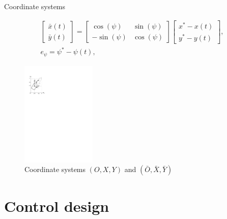\documentclass[10pt,pdf,hyperref={unicode}]{beamer}
\begin{document}
\begin{frame}{Coordinate systems}

\begin{eqnarray}
&\begin{bmatrix}
	\bar x(t)\\
	\bar y(t)
\end{bmatrix}
=
\begin{bmatrix}
	\cos(\psi)&\sin(\psi)\\
	-\sin(\psi)&\cos(\psi)
\end{bmatrix}
\begin{bmatrix}
	x^*-x(t)\\
	y^*-y(t)
\end{bmatrix},&\\
&e_\psi=\psi^*-\psi(t),&
\end{eqnarray}

\begin{figure}[b]
	\centering
	\includegraphics[height=5cm]{coordinate_systems}
	\caption{Coordinate systems $(O,X,Y)$ and $(\bar O,\bar X,\bar Y)$}
	\label{coordinate_systems}
\end{figure}

\end{frame}

\section {Control design}
\end{document}
